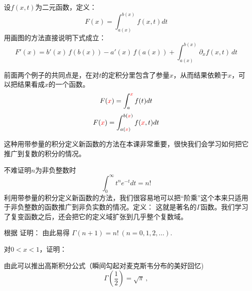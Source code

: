 \documentclass[CJK]{beamer}
\begin{document}
\begin{frame}
  \bch
  
  设$f(x,t)$为二元函数，定义：
  $$ F(x) = \int_{a(x)}^{b(x)} f(x, t) dt $$
  用画图的方法直接说明下式成立：
  $$ F'(x) =b'(x)\,f\left(b(x)\right)- a'(x)\,f\left(a(x)\right) + \int_{a(x)}^{b(x)} \partial_x f(x, t)\, dt $$

  \ech
\end{frame}

\begin{frame}
  \bch
  前面两个例子的共同点是，在对$t$的定积分里包含了参量$x$，从而结果依赖于$x$，可以把结果看成$x$的一个函数。
  $$ F({\color{red} x}) = \int_a^{{\color{red} x}} f(t) dt$$
  $$ F({\color{red} x}) = \int_{a({\color{red} x})}^{b({\color{red} x})} f({\color{red} x}, t) dt $$  
  \skiplines
  
  这种用带参量的积分定义新函数的方法在本课非常重要，很快我们会学习如何把它推广到复数的积分的情况。

  
  \ech
\end{frame}

\begin{frame}
  \bch
  不难证明$n$为非负整数时
  $$\int_0^\infty t^n e^{-t}dt = n!$$
  利用带参量的积分定义新函数的方法，我们很容易地可以把“阶乘”这个本来只适用于非负整数的函数推广到非负实数的情况。定义：
  这就是著名的$\Gamma$函数。我们学习了复变函数之后，还会把它的定义域扩张到几乎整个复数域。
  \ech
\end{frame}


\begin{frame}
  \bch
  根据
  证明：
由此易得 $\Gamma(n+1) = n!\ (n = 0,1,2,\ldots).$
\ech
\end{frame}

\begin{frame}
  \bch
  对$0<x<1$，证明：

  由此可以推出高斯积分公式（瞬间勾起对麦克斯韦分布的美好回忆\wulian)
  $$\Gamma(\frac{1}{2}) = \sqrt{\pi}\, ,$$
  
  \ech
\end{frame}
\end{document}
